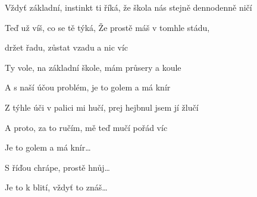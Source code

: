 \zr
Vždyť základní, instinkt ti říká, 
že škola nás stejně dennodenně ničí 

Teď už víš, co se tě týká,
Že prostě máš v tomhle stádu,

držet řadu, zůstat vzadu a nic víc 
\kr 

\zs
Ty vole, na základní škole, 
mám průsery a koule 

A s naší účou problém, 
je to golem a má knír 
\ks

\zs
Z týhle úči v palici mi hučí, 
prej hejbnul jsem jí žlučí 

A proto, za to ručím, 
mě teď mučí pořád víc 

Je to golem a má knír\ldots
 
S říďou chrápe, prostě hnůj\ldots
 
Je to k blití, vždyť to znáš\ldots
\ks

\kp
